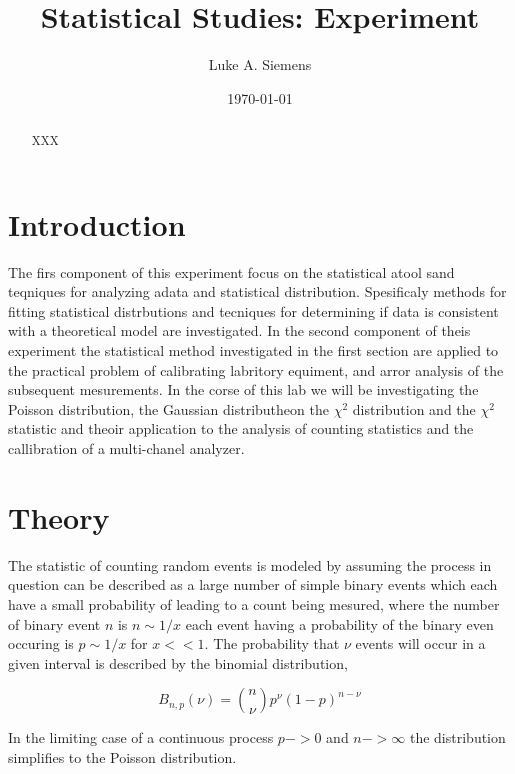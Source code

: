 \documentclass[%
 reprint,
 amsmath,amssymb,
 aps,
]{revtex4-1}
\begin{document}
\title{Statistical Studies: Experiment }%

\author{Luke A. Siemens}

\date{\today}

\begin{abstract}
XXX
\end{abstract}

\maketitle

\section{Introduction}

The firs component of this experiment focus on the statistical atool sand teqniques for analyzing adata and statistical distribution. Spesificaly methods for fitting statistical distrbutions and tecniques for determining if data is consistent with a theoretical model are investigated. In the second component of theis experiment the statistical method investigated in the first section are applied to the practical problem of calibrating labritory equiment, and arror analysis of the subsequent mesurements. In the corse of this lab we will be investigating the Poisson distribution, the Gaussian distributheon the $\chi^2$ distribution and the $\chi^2$ statistic and theoir application to the analysis of counting statistics and the callibration of a multi-chanel analyzer.

\section{Theory}
The statistic of counting random events is modeled by assuming the process in question can be described as a large number of simple binary events which each have a small probability of leading to a count being mesured, where the number of binary event $n$ is $n\sim1/x$ each event having a probability of the binary even occuring is $p\sim1/x$ for $x<<1$. The probability that $\nu$ events will occur in a given interval is described by the binomial distribution,

\[
B_{n,p}(\nu)={n \choose \nu}p^\nu(1-p)^{n-\nu}
\]

In the limiting case of a continuous process $p -> 0$ and $n -> \infty$ the distribution simplifies to the Poisson distribution.
\end{document}
